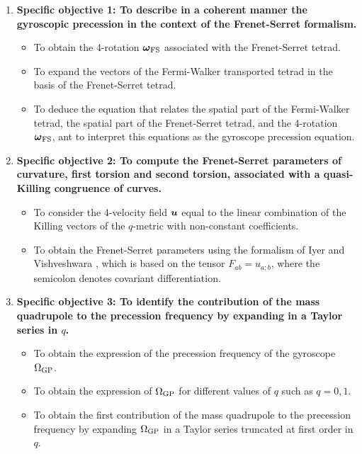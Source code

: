 \documentclass[12pt]{article}
\begin{document}
\begin{enumerate}
	\item {\bf Specific objective 1: To describe in a coherent manner the gyroscopic precession in the context of the Frenet-Serret formalism.}
	\begin{itemize}
		\item[\A{1}] To obtain the 4-rotation $\boldsymbol{\omega}_{\rm FS}$ associated with the Frenet-Serret tetrad.
		\item[\A{2}] To expand the vectors of the Fermi-Walker transported tetrad in the basis of the Frenet-Serret tetrad.
		\item[\A{3}] To deduce the equation that relates the spatial part of the Fermi-Walker tetrad, the spatial part of the Frenet-Serret tetrad, and the 4-rotation $\boldsymbol{\omega}_{\rm FS}$, ant to interpret this equations as the gyroscope precession equation.
	\end{itemize}

	\item {\bf Specific objective 2: To compute the Frenet-Serret parameters of curvature, first torsion and second torsion, associated with a quasi-Killing congruence of curves.}
	\begin{itemize}
		\item[\A{4}] To consider the 4-velocity field $\boldsymbol{u}$ equal to the linear combination of the Killing vectors of the $q$-metric with non-constant coefficients.
		\item[\A{5}] To obtain the Frenet-Serret parameters using the formalism of Iyer and Vishveshwara \cite{iyer1993frenet}, which is based on the tensor $F_{ab}=u_{a;b}$, where the semicolon denotes covariant differentiation. %
	\end{itemize}

	\item {\bf Specific objective 3: To identify the contribution of the mass quadrupole to the precession frequency by expanding in a Taylor series in $q$.}
	\begin{itemize}
		\item[\A{6}] To obtain the expression of the precession frequency of the gyroscope $\Omega_{\rm GP}$.
		\item[\A{7}] To obtain the expression of $\Omega_{\rm GP}$ for different values of $q$ such as $q=0,1$.
		\item[\A{8}] To obtain the first contribution of the mass quadrupole to the precession frequency by expanding $\Omega_{\rm GP}$ in a Taylor series truncated at first order in $q$.
	\end{itemize}			
	


\end{enumerate}
\end{document}
